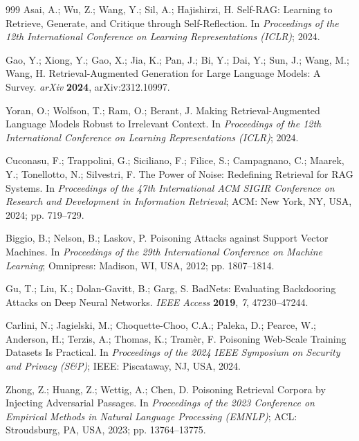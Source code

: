 \begin{thebibliography}{999}
Asai, A.; Wu, Z.; Wang, Y.; Sil, A.; Hajishirzi, H. Self-RAG: Learning to Retrieve, Generate,
and Critique through Self-Reflection. In \textit{Proceedings of the 12th International
Conference on Learning Representations (ICLR)}; 2024.

Gao, Y.; Xiong, Y.; Gao, X.; Jia, K.; Pan, J.; Bi, Y.; Dai, Y.; Sun, J.; Wang, M.; Wang, H.
Retrieval-Augmented Generation for Large Language Models: A Survey. \textit{arXiv}
\textbf{2024}, arXiv:2312.10997.

Yoran, O.; Wolfson, T.; Ram, O.; Berant, J. Making Retrieval-Augmented Language Models Robust
to Irrelevant Context. In \textit{Proceedings of the 12th International Conference on Learning
Representations (ICLR)}; 2024.

Cuconasu, F.; Trappolini, G.; Siciliano, F.; Filice, S.; Campagnano, C.; Maarek, Y.;
Tonellotto, N.; Silvestri, F. The Power of Noise: Redefining Retrieval for RAG Systems. In
\textit{Proceedings of the 47th International ACM SIGIR Conference on Research and Development
in Information Retrieval}; ACM: New York, NY, USA, 2024; pp. 719--729.


Biggio, B.; Nelson, B.; Laskov, P. Poisoning Attacks against Support Vector Machines. In
\textit{Proceedings of the 29th International Conference on Machine Learning}; Omnipress:
Madison, WI, USA, 2012; pp. 1807--1814.

Gu, T.; Liu, K.; Dolan-Gavitt, B.; Garg, S. BadNets: Evaluating Backdooring Attacks on Deep
Neural Networks. \textit{IEEE Access} \textbf{2019}, \textit{7}, 47230--47244.

Carlini, N.; Jagielski, M.; Choquette-Choo, C.A.; Paleka, D.; Pearce, W.; Anderson, H.;
Terzis, A.; Thomas, K.; Tram\`er, F. Poisoning Web-Scale Training Datasets Is Practical. In
\textit{Proceedings of the 2024 IEEE Symposium on Security and Privacy (S\&P)}; IEEE:
Piscataway, NJ, USA, 2024.

Zhong, Z.; Huang, Z.; Wettig, A.; Chen, D. Poisoning Retrieval Corpora by Injecting Adversarial
Passages. In \textit{Proceedings of the 2023 Conference on Empirical Methods in Natural
Language Processing (EMNLP)}; ACL: Stroudsburg, PA, USA, 2023; pp. 13764--13775.


\end{thebibliography}
